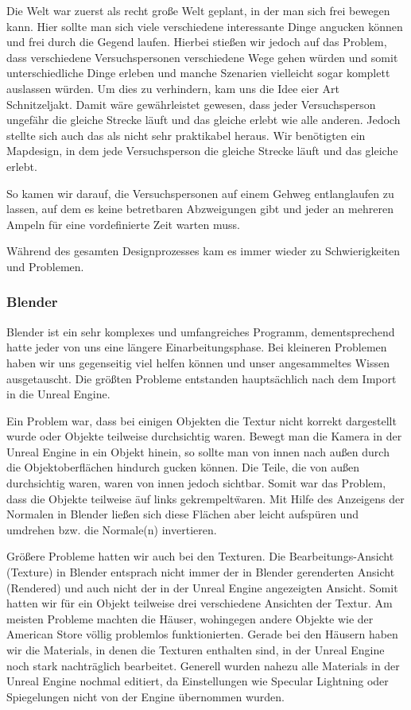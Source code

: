 \documentclass{Bericht}
\begin{document}
\newpage
		Die Welt war zuerst als recht große Welt geplant, in der man sich frei bewegen kann. Hier sollte man sich viele verschiedene interessante Dinge angucken können und frei durch die Gegend laufen. Hierbei stießen wir jedoch auf das Problem, dass verschiedene Versuchspersonen verschiedene Wege gehen würden und somit unterschiedliche Dinge erleben und manche Szenarien vielleicht sogar komplett auslassen würden. Um dies zu verhindern, kam uns die Idee eier Art Schnitzeljakt. Damit wäre gewährleistet gewesen, dass jeder Versuchsperson ungefähr die gleiche Strecke läuft und das gleiche erlebt wie alle anderen. Jedoch stellte sich auch das als nicht sehr praktikabel heraus. Wir benötigten ein Mapdesign, in dem jede Versuchsperson die gleiche Strecke läuft und das gleiche erlebt.

		So kamen wir darauf, die Versuchspersonen auf einem Gehweg entlanglaufen zu lassen, auf dem es keine betretbaren Abzweigungen gibt und jeder an mehreren Ampeln für eine vordefinierte Zeit warten muss. 
		
		Während des gesamten Designprozesses kam es immer wieder zu Schwierigkeiten und Problemen.
		
		\subsubsection{Blender}
			Blender ist ein sehr komplexes und umfangreiches Programm, dementsprechend hatte jeder von uns eine längere Einarbeitungsphase. Bei kleineren Problemen haben wir uns gegenseitig viel helfen können und unser angesammeltes Wissen ausgetauscht. Die größten Probleme entstanden hauptsächlich nach dem Import in die Unreal Engine. 

			Ein Problem war, dass bei einigen Objekten die Textur nicht korrekt dargestellt wurde oder Objekte teilweise durchsichtig waren. Bewegt man die Kamera in der Unreal Engine in ein Objekt hinein, so sollte man von innen nach außen durch die Objektoberflächen hindurch gucken können. Die Teile, die von außen durchsichtig waren, waren von innen jedoch sichtbar. Somit war das Problem, dass die Objekte teilweise \"auf links gekrempelt\" waren. Mit Hilfe des Anzeigens der Normalen in Blender ließen sich diese Flächen aber leicht aufspüren und umdrehen bzw. die Normale(n) invertieren.
			
			Größere Probleme hatten wir auch bei den Texturen. Die Bearbeitungs-Ansicht (Texture) in Blender entsprach nicht immer der in Blender gerenderten Ansicht (Rendered) und auch nicht der in der Unreal Engine angezeigten Ansicht. Somit hatten wir für ein Objekt teilweise drei verschiedene Ansichten der Textur. Am meisten Probleme machten die Häuser, wohingegen andere Objekte wie der American Store völlig problemlos funktionierten. Gerade bei den Häusern haben wir die Materials, in denen die Texturen enthalten sind, in der Unreal Engine noch stark nachträglich bearbeitet.
			Generell wurden nahezu alle Materials in der Unreal Engine nochmal editiert, da Einstellungen wie Specular Lightning oder Spiegelungen nicht von der Engine übernommen wurden.
			
\end{document}
